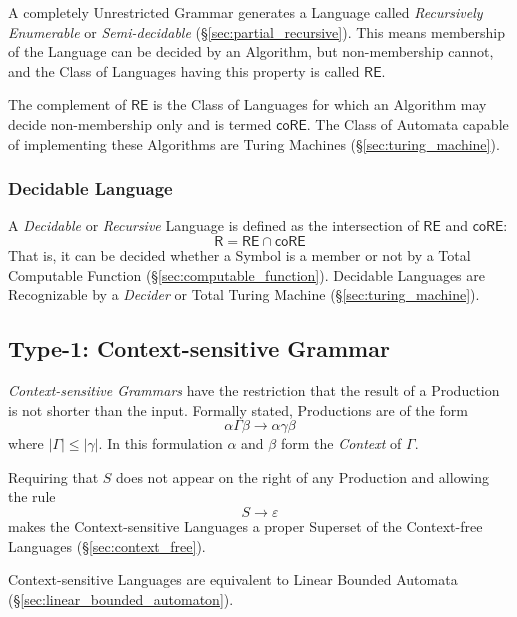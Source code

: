 A completely Unrestricted Grammar generates a Language called
\emph{Recursively Enumerable} or \emph{Semi-decidable}
(\S\ref{sec:partial_recursive}). This means membership of the Language
can be decided by an Algorithm, but non-membership cannot, and the
Class of Languages having this property is called $\mathsf{RE}$.

The complement of $\mathsf{RE}$ is the Class of Languages for which an
Algorithm may decide non-membership only and is termed
$\mathsf{coRE}$. The Class of Automata capable of implementing these
Algorithms are Turing Machines (\S\ref{sec:turing_machine}).



\subsubsection{Decidable Language}\label{sec:decidable_language}

A \emph{Decidable} or \emph{Recursive} Language is defined as the
intersection of $\mathsf{RE}$ and $\mathsf{coRE}$:
\[
  \mathsf{R} = \mathsf{RE} \cap \mathsf{coRE}
\]
That is, it can be decided whether a Symbol is a member or not by a
Total Computable Function (\S\ref{sec:computable_function}). Decidable
Languages are Recognizable by a \emph{Decider} or Total Turing Machine
(\S\ref{sec:turing_machine}).\cite{kozen97}



\subsection{Type-1: Context-sensitive Grammar}
\label{sec:context_sensitive}

\emph{Context-sensitive Grammars} have the restriction that the result
of a Production is not shorter than the input. Formally stated,
Productions are of the form
\[
  \alpha \Gamma \beta \rightarrow \alpha \gamma \beta
\]
where $|\Gamma| \leq |\gamma|$. In this formulation $\alpha$ and
$\beta$ form the \emph{Context} of $\Gamma$.

Requiring that $S$ does not appear on the right of any Production
and allowing the rule
\[
  S \rightarrow \varepsilon
\]
makes the Context-sensitive Languages a proper Superset of the
Context-free Languages (\S\ref{sec:context_free}).

Context-sensitive Languages are equivalent to Linear Bounded Automata
(\S\ref{sec:linear_bounded_automaton}).



